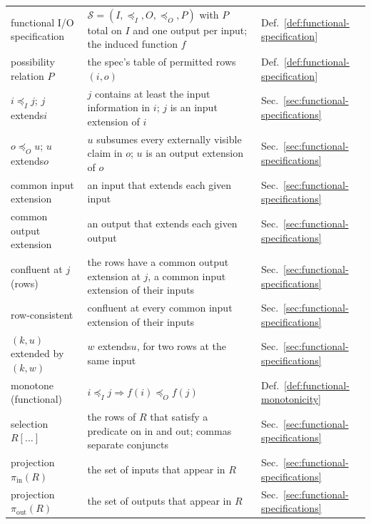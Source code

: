 \documentclass[sigconf]{cidr-2027}
\theoremstyle{remark}
\newcommand{\InputOrd}{\preceq_I}
\newcommand{\OutputOrd}{\preceq_O}
\newcommand{\inrel}{extends\xspace}          %
\newcommand{\indesc}{input extension\xspace} %
\newcommand{\outrel}{extends\xspace}          %
\newcommand{\outrelpast}{extended\xspace}     %
\newcommand{\outnoun}{output extension\xspace}%
\newcommand{\Spec}{\mathcal{S}}
\newcommand{\spectype}[1][]{I/O specification#1\xspace}
\begin{document}
{\footnotesize
\setlength{\tabcolsep}{3pt}
\renewcommand{\arraystretch}{1.15}

\noindent
\begin{tabular}{@{}>{\raggedright\arraybackslash}p{}>{\raggedright\arraybackslash}p{}>{\raggedright\arraybackslash}p{}@{}}
  \toprule
  \multicolumn{3}{@{}l}{\textbf{Functional CALM (\S\ref{sec:functional-calm})}}\\
  \midrule
  functional \spectype & $\Spec=(I,\InputOrd,O,\OutputOrd,P)$ with $P$ total on $I$ and one output per input; the induced function $f$ & Def.~\ref{def:functional-specification}\\
  possibility relation $P$ & the spec's table of permitted rows $(i,o)$ & Def.~\ref{def:functional-specification}\\
  $i\InputOrd j$; $j$ \inrel $i$ & $j$ contains at least the input information in $i$; $j$ is an \indesc of $i$ & Sec.~\ref{sec:functional-specifications}\\
  $o\OutputOrd u$; $u$ \outrel $o$ & $u$ subsumes every externally visible claim in $o$; $u$ is an \outnoun of $o$ & Sec.~\ref{sec:functional-specifications}\\
  common \indesc & an input that \inrel each given input & Sec.~\ref{sec:functional-specifications}\\
  common \outnoun & an output that \outrel each given output & Sec.~\ref{sec:functional-specifications}\\
  confluent at $j$ (rows) & the rows have a common \outnoun at $j$, a common \indesc of their inputs & Sec.~\ref{sec:functional-specifications}\\
  row-consistent & confluent at every common \indesc of their inputs & Sec.~\ref{sec:functional-specifications}\\
  $(k,u)$ \outrelpast by $(k,w)$ & $w$ \outrel $u$, for two rows at the same input & Sec.~\ref{sec:functional-specifications}\\
  monotone (functional) & $i\InputOrd j\Rightarrow f(i)\OutputOrd f(j)$ & Def.~\ref{def:functional-monotonicity}\\
  selection $R[\ldots]$ & the rows of $R$ that satisfy a predicate on $\mathrm{in}$ and $\mathrm{out}$; commas separate conjuncts & Sec.~\ref{sec:functional-specifications}\\
  projection $\pi_{\mathrm{in}}(R)$ & the set of inputs that appear in $R$ & Sec.~\ref{sec:functional-specifications}\\
  projection $\pi_{\mathrm{out}}(R)$ & the set of outputs that appear in $R$ & Sec.~\ref{sec:functional-specifications}\\

\end{tabular}}
\end{document}
